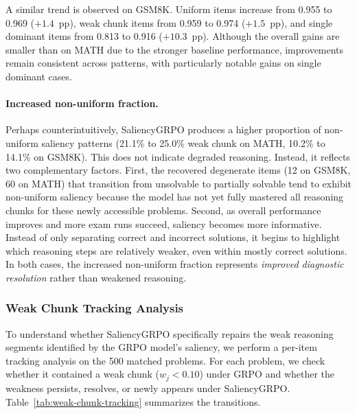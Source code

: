 \documentclass[12pt]{report}
\begin{document}
A similar trend is observed on GSM8K. Uniform items increase from 0.955 to 0.969
($+1.4$~pp), weak chunk items from 0.959 to 0.974 ($+1.5$~pp), and single dominant
items from 0.813 to 0.916 ($+10.3$~pp). Although the overall gains are smaller than
on MATH due to the stronger baseline performance, improvements remain consistent
across patterns, with particularly notable gains on single dominant cases.

\paragraph{Increased non-uniform fraction.}
Perhaps counterintuitively, SaliencyGRPO produces a higher proportion of non-uniform saliency
patterns (21.1\% to 25.0\% weak chunk on MATH, 10.2\% to 14.1\% on GSM8K). 
This does not indicate degraded reasoning. Instead, it reflects two complementary factors.
First, the recovered degenerate items (12 on GSM8K, 60 on MATH) that transition from unsolvable to partially
solvable tend to exhibit non-uniform saliency because the model has not yet fully mastered all
reasoning chunks for these newly accessible problems.  
Second, as overall performance improves and more exam runs succeed,
saliency becomes more informative. Instead of only separating correct
and incorrect solutions, it begins to highlight which reasoning
steps are relatively weaker, even within mostly correct solutions.
In both cases, the increased non-uniform fraction represents \emph{improved diagnostic resolution}
rather than weakened reasoning.

\subsubsection{Weak Chunk Tracking Analysis}

To understand whether SaliencyGRPO specifically repairs the weak reasoning segments identified
by the GRPO model's saliency, we perform a per-item tracking analysis on the 500 matched
problems.  For each problem, we check whether it contained a weak chunk ($w_j < 0.10$)
under GRPO and whether the weakness persists, resolves, or newly appears under SaliencyGRPO.
Table~\ref{tab:weak-chunk-tracking} summarizes the transitions.
\end{document}
